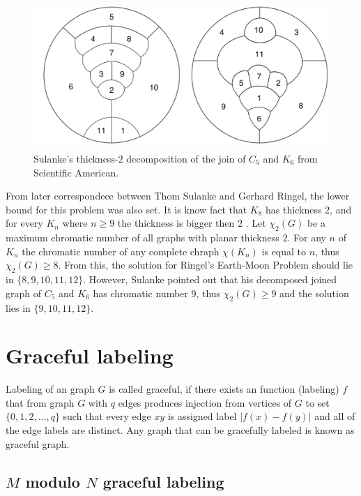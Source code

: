 \begin{figure}[H]
\includegraphics[width=\textwidth]{images/sulankeGraph.PNG}
\caption{Sulanke's thickness-$2$ decomposition of the join of $C_5$ and $K_6$ from Scientific American.}
\end{figure}

From later correspondece between Thom Sulanke and Gerhard Ringel, the lower bound for this problem was also set. It is know fact that $K_8$ has thickness $2$, and for every $K_n$ where $n \geq 9$ the thickness is bigger then $2$ \parencite{battle1962every}. Let $\chi_2(G)$ be a maximum chromatic number of all graphs with planar thickness $2$. For any $n$ of $K_n$ the chromatic number of any complete chraph $\chi(K_n)$ is equal to $n$, thus $\chi_2(G) \geq 8$. From this, the solution for Ringel’s Earth-Moon Problem should lie in $\{8,9,10,11,12\}$. However, Sulanke pointed out that his decomposed joined graph of $C_5$ and $K_6$ has chromatic number 9, thus $\chi_2(G) \geq 9$ and the solution lies in $\{9,10,11,12\}$.

\section{Graceful labeling}

Labeling of an graph $G$ is called graceful, if there exists an function (labeling) $f$ that from graph $G$  with $q$ edges produces injection from vertices of $G$ to set $ \{0,1, 2, \dots, q\} $ such that every edge $xy$ is assigned label $ |f(x) - f(y)| $ and all of the edge labels are distinct. Any graph that can be gracefully labeled is known as graceful graph. \parencite{Velmurugan2019graceful}

\subsection{$M$ modulo $N$ graceful labeling}
\label{graceful}

